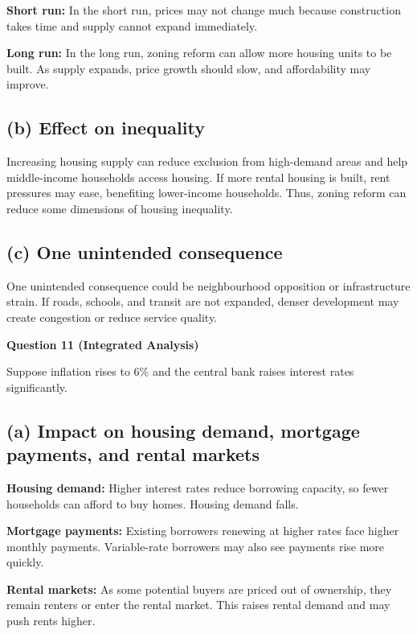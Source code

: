 \documentclass[12pt]{article}
\begin{document}
\textbf{Short run:}  
In the short run, prices may not change much because construction takes time and supply cannot expand immediately.

\textbf{Long run:}  
In the long run, zoning reform can allow more housing units to be built. As supply expands, price growth should slow, and affordability may improve.

\subsection*{(b) Effect on inequality}

Increasing housing supply can reduce exclusion from high-demand areas and help middle-income households access housing. If more rental housing is built, rent pressures may ease, benefiting lower-income households. Thus, zoning reform can reduce some dimensions of housing inequality.

\subsection*{(c) One unintended consequence}

One unintended consequence could be neighbourhood opposition or infrastructure strain. If roads, schools, and transit are not expanded, denser development may create congestion or reduce service quality.

\textbf{Question 11 (Integrated Analysis)}

Suppose inflation rises to 6\% and the central bank raises interest rates significantly.

\subsection*{(a) Impact on housing demand, mortgage payments, and rental markets}

\textbf{Housing demand:}  
Higher interest rates reduce borrowing capacity, so fewer households can afford to buy homes. Housing demand falls.

\textbf{Mortgage payments:}  
Existing borrowers renewing at higher rates face higher monthly payments. Variable-rate borrowers may also see payments rise more quickly.

\textbf{Rental markets:}  
As some potential buyers are priced out of ownership, they remain renters or enter the rental market. This raises rental demand and may push rents higher.
\end{document}
